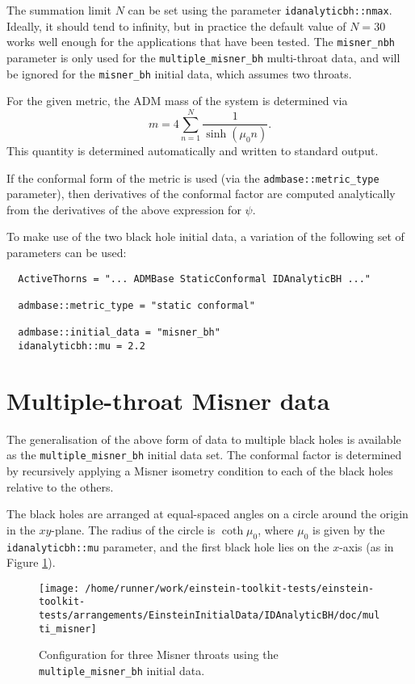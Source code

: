 \documentclass{article}
\begin{document}
The summation limit $N$ can be set using the parameter
\texttt{idanalyticbh::nmax}. Ideally, it should tend to infinity, but
in practice the default value of $N=30$ works well enough for the
applications that have been tested. The \texttt{misner\_nbh} parameter
is only used for the \texttt{multiple\_misner\_bh} multi-throat data,
and will be ignored for the \texttt{misner\_bh} initial data, which
assumes two throats.

For the given metric, the ADM mass of the system is determined via
\begin{equation}
  m = 4 \sum^N_{n=1} \frac{1}{\sinh(\mu_0 n)}.
\end{equation}
This quantity is determined automatically and written to standard
output.

If the conformal form of the metric is used (via the
\texttt{admbase::metric\_type} parameter), then derivatives of the
conformal factor are computed analytically from the derivatives of the
above expression for $\psi$.

To make use of the two black hole initial data, a variation of the
following set of parameters can be used:
\begin{verbatim}
  ActiveThorns = "... ADMBase StaticConformal IDAnalyticBH ..."

  admbase::metric_type = "static conformal"

  admbase::initial_data = "misner_bh"
  idanalyticbh::mu = 2.2
\end{verbatim}


\section{Multiple-throat Misner data}

The generalisation of the above form of data to multiple black holes
is available as the \texttt{multiple\_misner\_bh} initial data set. The
conformal factor is determined by recursively applying a Misner
isometry condition to each of the black holes relative to the others.

The black holes are arranged at equal-spaced angles on a circle around
the origin in the $xy$-plane. The radius of the circle is $\coth\mu_0$,
where $\mu_0$ is given by the \texttt{idanalyticbh::mu} parameter, and
the first black hole lies on the $x$-axis (as in Figure
\ref{fig:multi_misner}).
\begin{figure}
  \centering
  \label{fig:multi_misner}
  \texttt{[image: /home/runner/work/einstein-toolkit-tests/einstein-toolkit-tests/arrangements/EinsteinInitialData/IDAnalyticBH/doc/multi\_misner]}
  \caption{Configuration for three Misner throats using the
  \texttt{multiple\_misner\_bh} initial data.}
\end{figure}
\end{document}
